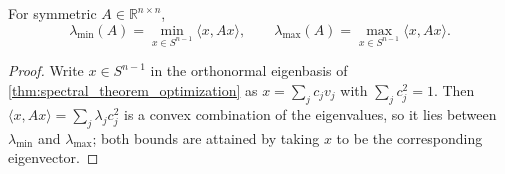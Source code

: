 \begin{corollary}
\label{cor:courant_fischer_extreme}
For symmetric $A \in \mathbb{R}^{n\times n}$,
\[\lambda_{\min}(A) = \min_{x \in S^{n-1}}\langle x,Ax\rangle, \qquad
  \lambda_{\max}(A) = \max_{x \in S^{n-1}}\langle x,Ax\rangle.\]
\end{corollary}

\begin{proof}
Write $x \in S^{n-1}$ in the orthonormal eigenbasis of \cref{thm:spectral_theorem_optimization}
as $x = \sum_j c_jv_j$ with $\sum_j c_j^2 = 1$. Then
$\langle x,Ax\rangle = \sum_j \lambda_jc_j^2$ is a convex combination of the eigenvalues, so it
lies between $\lambda_{\min}$ and $\lambda_{\max}$; both bounds are attained by taking $x$ to be
the corresponding eigenvector.
\end{proof}
